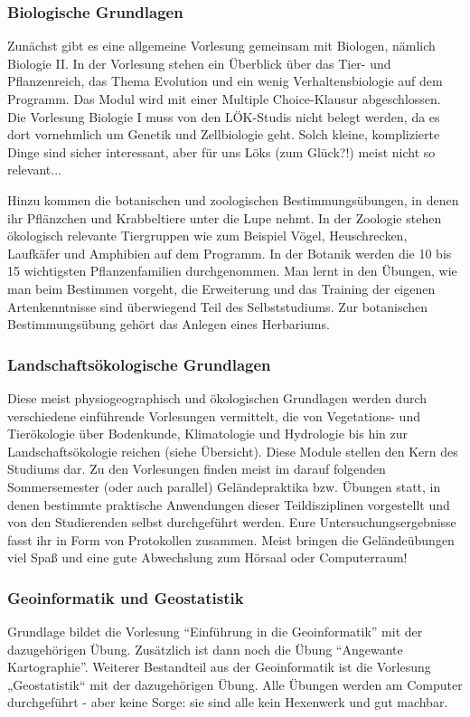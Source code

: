 \subsubsection{Biologische Grundlagen}
Zunächst gibt es eine allgemeine Vorlesung gemeinsam mit Biologen, nämlich Biologie II. In der Vorlesung stehen ein Überblick über das Tier- und Pflanzenreich, das Thema Evolution und ein wenig Verhaltensbiologie auf dem Programm. Das Modul wird mit einer Multiple Choice-Klausur abgeschlossen. Die Vorlesung Biologie I muss von den LÖK-Studis nicht belegt werden, da es dort vornehmlich um Genetik und Zellbiologie geht. Solch kleine, komplizierte Dinge sind sicher interessant, aber für uns Löks (zum Glück?!) meist nicht so relevant...

Hinzu kommen die botanischen und zoologischen Bestimmungsübungen, in denen ihr Pflänzchen und Krabbeltiere unter die Lupe nehmt. In der Zoologie stehen ökologisch relevante Tiergruppen wie zum Beispiel Vögel, Heuschrecken, Laufkäfer und Amphibien auf dem Programm. In der Botanik werden die 10 bis 15 wichtigsten Pflanzenfamilien durchgenommen. Man lernt in den Übungen, wie man beim Bestimmen vorgeht, die Erweiterung und das Training der eigenen Artenkenntnisse sind überwiegend Teil des Selbststudiums. Zur botanischen Bestimmungsübung gehört das Anlegen eines Herbariums.

\subsubsection*{Landschaftsökologische Grundlagen}
Diese meist physiogeographisch und ökologischen Grundlagen werden durch verschiedene einführende Vorlesungen vermittelt, die von Vegetations- und Tierökologie über Bodenkunde, Klimatologie und Hydrologie bis hin zur Landschaftsökologie reichen (siehe Übersicht). Diese Module stellen den Kern des Studiums dar. Zu den Vorlesungen ﬁnden meist im darauf folgenden Sommersemester (oder auch parallel) Geländepraktika bzw. Übungen statt, in denen bestimmte praktische Anwendungen dieser Teildisziplinen vorgestellt und von den Studierenden selbst durchgeführt werden. Eure Untersuchungsergebnisse fasst ihr in Form von Protokollen zusammen. Meist bringen die Geländeübungen viel Spaß und eine gute Abwechslung zum Hörsaal oder Computerraum!

\subsubsection*{Geoinformatik und Geostatistik}
Grundlage bildet die Vorlesung \enquote{Einführung in die Geoinformatik} mit der dazugehörigen Übung. Zusätzlich ist dann noch die Übung \enquote{Angewante Kartographie}. Weiterer Bestandteil aus der Geoinformatik ist die Vorlesung „Geostatistik“ mit der dazugehörigen Übung. Alle Übungen werden am Computer durchgeführt - aber keine Sorge: sie sind alle kein Hexenwerk und gut machbar.

